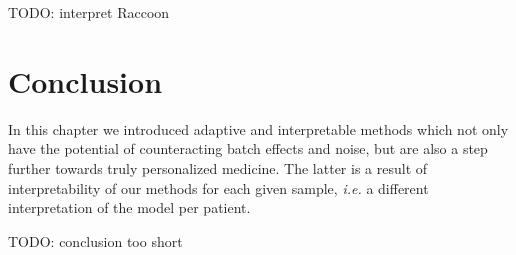 TODO: interpret Raccoon

\section{Conclusion}
In this chapter we introduced adaptive and interpretable methods which not only have the potential of counteracting batch effects and noise, but are also a step further towards truly personalized medicine. The latter is a result of interpretability of our methods for each given sample, \emph{i.e.} a different interpretation of the model per patient.

TODO: conclusion too short
